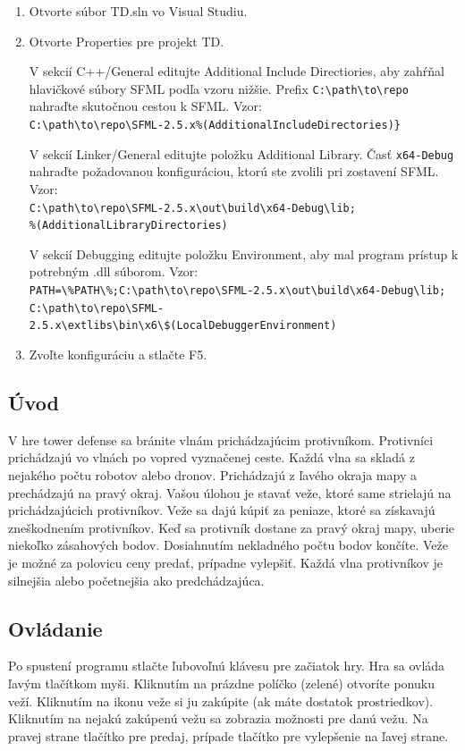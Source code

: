 \documentclass[12pt]{article}
\begin{document}
\begin{enumerate}
    \item Otvorte súbor TD.sln vo Visual Studiu.
    \item Otvorte Properties pre projekt TD.

        V sekcií C++/General editujte Additional Include Directiories, aby zahŕňal
        hlavičkové súbory SFML podľa vzoru nižšie. Prefix \verb|C:\path\to\repo| nahraďte
        skutočnou cestou k SFML. Vzor: \\
        \verb|C:\path\to\repo\SFML-2.5.x%(AdditionalIncludeDirectories)}|


        V sekcií Linker/General editujte položku Additional Library. Časť \verb|x64-Debug|
        nahraďte požadovanou konfiguráciou, ktorú ste zvolili pri zostavení SFML.
        Vzor: \\
        \verb|C:\path\to\repo\SFML-2.5.x\out\build\x64-Debug\lib;| \\
        \verb|%(AdditionalLibraryDirectories)|


        V sekcií Debugging editujte položku Environment, aby mal program prístup
        k potrebným .dll súborom. 
        Vzor: \\
        \verb|PATH=\%PATH\%;C:\path\to\repo\SFML-2.5.x\out\build\x64-Debug\lib;| \\
        \verb|C:\path\to\repo\SFML-2.5.x\extlibs\bin\x6\$(LocalDebuggerEnvironment)|
    \item Zvoľte konfiguráciu a stlačte F5.
\end{enumerate}

\subsection{Úvod}
V hre tower defense sa bránite vlnám prichádzajúcim protivníkom. Protivníci prichádzajú
vo vlnách po vopred vyznačenej ceste. Každá vlna sa skladá z nejakého počtu robotov alebo dronov.
Prichádzajú z ľavého okraja mapy a prechádzajú na pravý okraj. Vašou úlohou je stavať veže, ktoré same
strielajú na prichádzajúcich protivníkov. Veže sa dajú kúpiť za peniaze, ktoré sa získavajú zneškodnením
protivníkov. Keď sa protivník dostane za pravý okraj mapy, uberie niekoľko zásahových bodov. Dosiahnutím
nekladného počtu bodov končíte. Veže je možné za polovicu ceny predať, prípadne vylepšiť.
Každá vlna protivníkov je silnejšia alebo početnejšia ako predchádzajúca.

\subsection{Ovládanie}
Po spustení programu stlačte ľubovoľnú klávesu pre začiatok hry. Hra sa ovláda ľavým tlačítkom myši.
Kliknutím na prázdne políčko (zelené) otvoríte ponuku veží. Kliknutím na ikonu veže si ju zakúpite
(ak máte dostatok prostriedkov). Kliknutím na nejakú zakúpenú vežu sa zobrazia možnosti pre danú vežu.
Na pravej strane tlačítko pre predaj, prípade tlačítko pre vylepšenie na ľavej strane.
\end{document}
